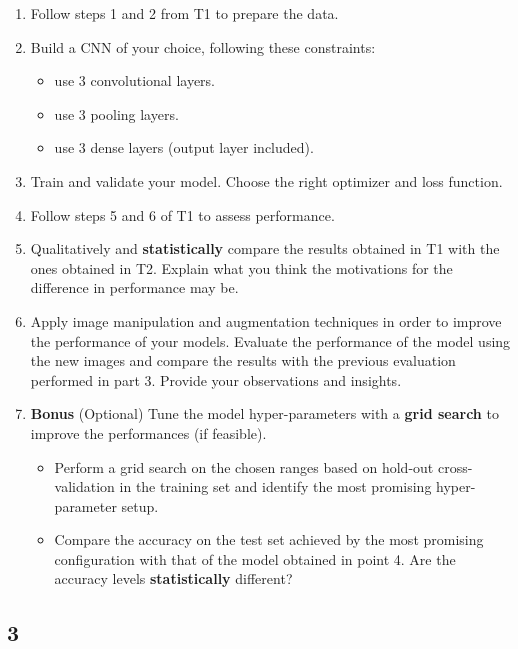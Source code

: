 \documentclass[11pt]{scrartcl}
\begin{document}
\begin{enumerate}
\item Follow steps 1 and 2 from T1 to prepare the data.

\item Build a CNN of your choice, following these constraints: 

	\begin{itemize}
	\item use 3 convolutional layers.
	\item use 3 pooling layers.
	\item use 3 dense layers (output layer included).
	\end{itemize}

\item Train and validate your model. Choose the right optimizer and loss function. 

\item Follow steps 5 and 6 of T1 to assess performance.

\item Qualitatively and \textbf{statistically} compare the results 
obtained in T1 with the ones obtained in T2. 
Explain what you think the motivations for the difference in performance may be.

\item Apply image manipulation and augmentation techniques in order to improve the performance
of your models. Evaluate the performance of the model using the new images and compare the
results with the previous evaluation performed in part 3. Provide your observations and insights.

\item \textbf{Bonus} (Optional) 
Tune the model hyper-parameters with a \textbf{grid search} 
to improve the performances (if feasible).

	\begin{itemize}
	\item Perform a grid search on the chosen ranges based on hold-out cross-validation 
	in the training set and identify the most promising hyper-parameter setup.

	\item Compare the accuracy on the test set achieved by the most promising configuration 
	with that of the model obtained in point 4. 
	Are the accuracy levels \textbf{statistically} different?
	\end{itemize}
\end{enumerate}

\subsection*{3}
\end{document}
